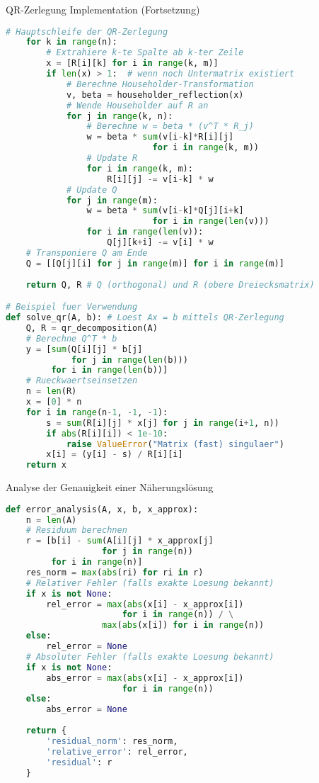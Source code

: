 \begin{examplecode}{QR-Zerlegung Implementation (Fortsetzung)}
\begin{lstlisting}[language=Python, style=basesmol]
    # Hauptschleife der QR-Zerlegung
    for k in range(n):
        # Extrahiere k-te Spalte ab k-ter Zeile
        x = [R[i][k] for i in range(k, m)]
        if len(x) > 1:  # wenn noch Untermatrix existiert
            # Berechne Householder-Transformation
            v, beta = householder_reflection(x)
            # Wende Householder auf R an
            for j in range(k, n):
                # Berechne w = beta * (v^T * R_j)
                w = beta * sum(v[i-k]*R[i][j] 
                             for i in range(k, m))
                # Update R
                for i in range(k, m):
                    R[i][j] -= v[i-k] * w
            # Update Q
            for j in range(m):
                w = beta * sum(v[i-k]*Q[j][i+k] 
                             for i in range(len(v)))
                for i in range(len(v)):
                    Q[j][k+i] -= v[i] * w
    # Transponiere Q am Ende
    Q = [[Q[j][i] for j in range(m)] for i in range(m)]
    
    return Q, R # Q (orthogonal) und R (obere Dreiecksmatrix)

# Beispiel fuer Verwendung
def solve_qr(A, b): # Loest Ax = b mittels QR-Zerlegung
    Q, R = qr_decomposition(A)
    # Berechne Q^T * b
    y = [sum(Q[i][j] * b[j] 
             for j in range(len(b))) 
         for i in range(len(b))]
    # Rueckwaertseinsetzen
    n = len(R)
    x = [0] * n
    for i in range(n-1, -1, -1):
        s = sum(R[i][j] * x[j] for j in range(i+1, n))
        if abs(R[i][i]) < 1e-10:
            raise ValueError("Matrix (fast) singulaer")
        x[i] = (y[i] - s) / R[i][i]
    return x
\end{lstlisting}
\end{examplecode}

\begin{examplecode}{Analyse der Genauigkeit einer Näherungslösung}
\begin{lstlisting}[language=Python, style=basesmol]
def error_analysis(A, x, b, x_approx):
    n = len(A)
    # Residuum berechnen
    r = [b[i] - sum(A[i][j] * x_approx[j] 
                   for j in range(n)) 
         for i in range(n)]
    res_norm = max(abs(ri) for ri in r)
    # Relativer Fehler (falls exakte Loesung bekannt)
    if x is not None:
        rel_error = max(abs(x[i] - x_approx[i]) 
                       for i in range(n)) / \
                   max(abs(x[i]) for i in range(n))
    else:
        rel_error = None
    # Absoluter Fehler (falls exakte Loesung bekannt)
    if x is not None:
        abs_error = max(abs(x[i] - x_approx[i]) 
                       for i in range(n))
    else:
        abs_error = None
    
    return {
        'residual_norm': res_norm,
        'relative_error': rel_error,
        'residual': r
    }
\end{lstlisting}
\end{examplecode}

